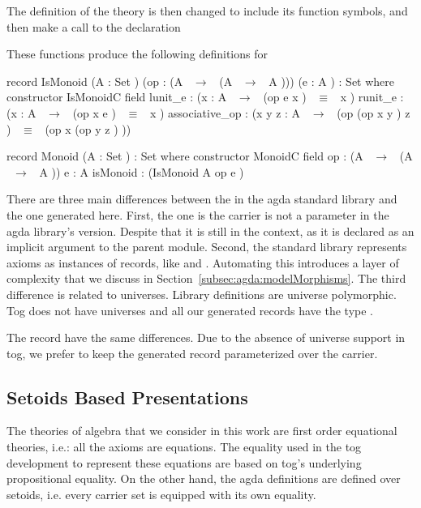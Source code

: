 The definition of the theory  is then changed to include its function symbols, and then make a call to the  declaration 
These functions produce the following definitions for 
\begin{agdacode}
record IsMonoid (A  : Set ) (op  : (A  ~$\to$~ (A ~$\to$~ A ))) (e  : A )  : Set where
  constructor IsMonoidC
  field
   lunit_e : ({x  : A }  ~$\to$~ (op e x ) ~$\equiv$~ x )
   runit_e : ({x  : A }  ~$\to$~ (op x e ) ~$\equiv$~ x )
   associative_op : ({x y z  : A }  ~$\to$~ (op (op x y ) z ) ~$\equiv$~ (op x (op y z ) )) 

record Monoid (A  : Set )  : Set where
  constructor MonoidC
  field
   op : (A  ~$\to$~ (A  ~$\to$~ A ))
   e : A 
   isMonoid : (IsMonoid A op e ) 
\end{agdacode}
There are three main differences between the  in the agda standard library and the one generated here. First, the one is the carrier is not a parameter in the agda library's version. Despite that it is still in the context, as it is declared as an implicit argument to the parent module. Second, the standard library represents axioms as instances of records, like  and . Automating this introduces a layer of complexity that we discuss in Section~\ref{subsec:agda:modelMorphisms}. The third difference is related to universes. Library definitions are universe polymorphic. Tog does not have universes and all our generated records have the type . 

The record  have the same differences. Due to the absence of universe support in tog, we prefer to keep the generated  record parameterized over the carrier. 

\subsection{Setoids Based Presentations}
\label{subsec:setoid-based-pres}
The theories of algebra that we consider in this work are first order equational theories, i.e.: all the axioms are equations. The equality used in the tog development to represent these equations are based on tog's underlying propositional equality. 
On the other hand, the agda definitions are defined over setoids, i.e. every carrier set is equipped with its own equality. 

